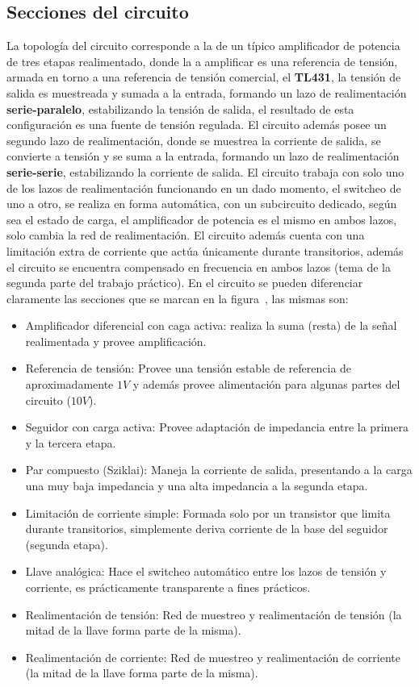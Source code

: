 
\subsection{Secciones del circuito}


\normalfont

La topología del circuito corresponde a la de un típico amplificador de potencia de tres etapas realimentado, donde la  a amplificar es una referencia de tensión, armada en torno a una referencia de tensión comercial, el \textbf{TL431}, la tensión de salida es muestreada y sumada a la entrada, formando un lazo de realimentación \textbf{serie-paralelo}, estabilizando la tensión de salida, el resultado de esta configuración es una fuente de tensión regulada. El circuito además posee un segundo lazo de realimentación, donde se muestrea la corriente de salida, se convierte a tensión y se suma a la entrada, formando un lazo de realimentación \textbf{serie-serie}, estabilizando la corriente de salida. El circuito trabaja con solo uno de los lazos de realimentación funcionando en un dado momento, el switcheo de uno a otro, se realiza en forma automática, con un subcircuito dedicado, según sea el estado de carga, el amplificador de potencia es el mismo en ambos lazos, solo cambia la red de realimentación. El circuito además cuenta con una limitación extra de corriente que actúa únicamente durante transitorios, además el circuito se encuentra compensado en frecuencia en ambos lazos (tema de la segunda parte del trabajo práctico).
En el circuito se pueden diferenciar claramente las secciones que se marcan en la figura~, las mismas son:


\begin{itemize}
\item Amplificador diferencial con caga activa: realiza la suma (resta) de la señal realimentada y provee amplificación.
\item Referencia de tensión: Provee una tensión estable de referencia de aproximadamente $1 V$ y además provee alimentación para algunas partes del circuito ($10 V$).
\item Seguidor con carga activa: Provee adaptación de impedancia entre la primera y la tercera etapa.
\item Par compuesto (Sziklai): Maneja la corriente de salida, presentando a la carga una muy baja impedancia y una alta impedancia a la segunda etapa.
\item Limitación de corriente simple: Formada solo por un transistor que limita durante transitorios, simplemente deriva corriente de la base del seguidor (segunda etapa).
\item Llave analógica: Hace el switcheo automático entre los lazos de tensión y corriente, es prácticamente transparente a fines prácticos.
\item Realimentación de tensión: Red de muestreo y realimentación de tensión (la mitad de la llave forma parte de la misma).
\item Realimentación de corriente: Red de muestreo y realimentación de corriente (la mitad de la llave forma parte de la misma).
\end{itemize}

